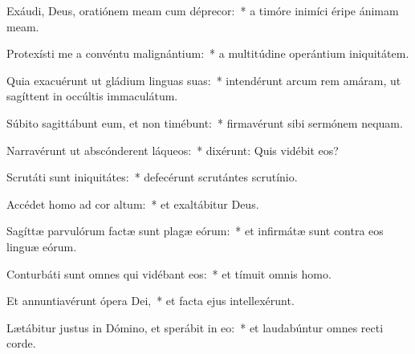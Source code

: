 \item Exáudi, Deus, oratiónem meam cum déprecor:~* a timóre inimíci éripe ánimam meam.

\item Protexísti me a convéntu malignántium:~* a multitúdine operántium iniquitátem.

\item Quia exacuérunt ut gládium linguas suas:~* intendérunt arcum rem amáram, ut sagíttent in occúltis immaculátum.

\item Súbito sagittábunt eum, et non timébunt:~* firmavérunt sibi sermónem nequam.

\item Narravérunt ut abscónderent láqueos:~* dixérunt: Quis vidébit eos?

\item Scrutáti sunt iniquitátes:~* defecérunt scrutántes scrutínio.

\item Accédet homo ad cor altum:~* et exaltábitur Deus.

\item Sagíttæ parvulórum factæ sunt plagæ eórum:~* et infirmátæ sunt contra eos linguæ eórum.

\item Conturbáti sunt omnes qui vidébant eos:~* et tímuit omnis homo.

\item Et annuntiavérunt ópera Dei,~* et facta ejus intellexérunt.

\item Lætábitur justus in Dómino, et sperábit in eo:~* et laudabúntur omnes recti corde.

